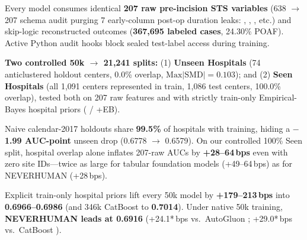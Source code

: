 \documentclass[10pt,letterpaper]{article}
\begin{document}
\noindent
\begin{minipage}[t]{0.486\textwidth}
  \vspace{0pt}
  {\fontsize{7.85}{9.7}\selectfont
  Every model consumes identical \textbf{207 raw pre-incision STS variables} (638 $\to$ 207 schema audit purging 7 early-column post-op duration leaks: , , , etc.) and skip-logic reconstructed outcomes (\textbf{367,695 labeled cases}, 24.30\% POAF). Active Python audit hooks block sealed test-label access during training.

  \vspace{2.2pt}
  \textbf{Two controlled 50k $\to$ 21,241 splits:} (1) \textbf{Unseen Hospitals} (74 anticlustered holdout centers, 0.0\% overlap, $\mathrm{Max}|\mathrm{SMD}|{=}0.103$); and (2) \textbf{Seen Hospitals} (all 1,091 centers represented in train, 1,086 test centers, 100.0\% overlap), tested both on 207 raw features and with strictly train-only Empirical-Bayes hospital priors ( / +EB).
  }
\end{minipage}\hfill
\begin{minipage}[t]{0.486\textwidth}
  \vspace{0pt}
  {\fontsize{7.85}{9.7}\selectfont
  Naive calendar-2017 holdouts share \textbf{99.5\%} of hospitals with training, hiding a \textbf{$-$1.99 AUC-point} unseen drop (0.6778 $\to$ 0.6579). On our controlled 100\% Seen split, hospital overlap alone inflates 207-raw AUCs by \textbf{+28--64\,bps} even with zero site IDs---twice as large for tabular foundation models (+49--64\,bps) as for NEVERHUMAN (+28\,bps).

  \vspace{2.2pt}
  Explicit train-only hospital priors lift every 50k model by \textbf{+179--213\,bps} into \textbf{0.6966--0.6986} (and 346k CatBoost to \textbf{0.7014}). Under native 50k  training, \textbf{NEVERHUMAN leads at 0.6916} (+24.1*\,bps vs.\ AutoGluon ; +29.0*\,bps vs.\ CatBoost ).
  }
\end{minipage}

\clearpage
\thispagestyle{briefpage2}

\end{document}
